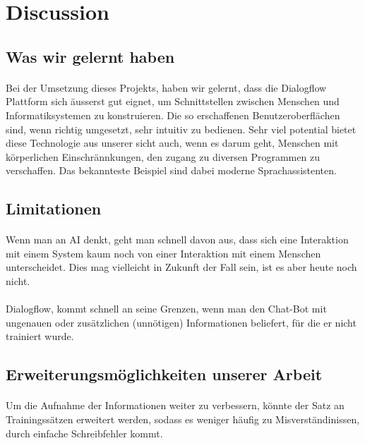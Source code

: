 \documentclass[11pt,a4paper]{article}
\begin{document}
\newpage

\section{Discussion}
    \subsection{Was wir gelernt haben}
        \paragraph{}
            Bei der Umsetzung dieses Projekts, haben wir gelernt, dass die Dialogflow Plattform sich äusserst gut eignet, um Schnittstellen
            zwischen Menschen und Informatiksystemen zu konstruieren. Die so erschaffenen Benutzeroberflächen sind, wenn richtig umgesetzt,
            sehr intuitiv zu bedienen. Sehr viel potential bietet diese Technologie aus unserer sicht auch, wenn es darum geht, Menschen mit
            körperlichen Einschrännkungen, den zugang zu diversen Programmen zu verschaffen. Das bekannteste Beispiel sind dabei moderne Sprachassistenten.
    \subsection{Limitationen}
        \paragraph{}
            Wenn man an AI denkt, geht man schnell davon aus, dass sich eine Interaktion mit einem System kaum noch von einer Interaktion mit einem
            Menschen unterscheidet. Dies mag vielleicht in Zukunft der Fall sein, ist es aber heute noch nicht. 
        \paragraph{}
            Dialogflow, kommt schnell an seine Grenzen, wenn man den Chat-Bot mit ungenauen oder zusätzlichen (unnötigen) Informationen beliefert,
            für die er nicht trainiert wurde. 
    \subsection{Erweiterungsmöglichkeiten unserer Arbeit}
        \paragraph{}
            Um die Aufnahme der Informationen weiter zu verbessern, könnte der Satz an Trainingssätzen erweitert werden, sodass es weniger häufig
            zu Misverständinissen, durch einfache Schreibfehler kommt.
\end{document}
